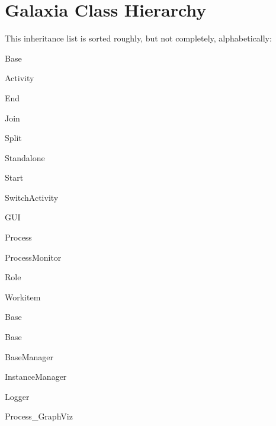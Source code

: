 \section{Galaxia Class Hierarchy}
This inheritance list is sorted roughly, but not completely, alphabetically:\begin{CompactList}
\item {}
\begin{CompactList}
\item Base\begin{CompactList}
\item {}
\begin{CompactList}
\item Activity\item End\item Join\item Split\item Standalone\item Start\item Switch\-Activity\end{CompactList}
\item GUI\item {}
\item Process\item Process\-Monitor\item Role\item Workitem\end{CompactList}
\item Base\item Base\item Base\-Manager\begin{CompactList}
\item {}
\item Instance\-Manager\item {}
\item {}
\end{CompactList}
\end{CompactList}
\item {}
\begin{CompactList}
\item Logger\end{CompactList}
\item Process\_\-Graph\-Viz\end{CompactList}
